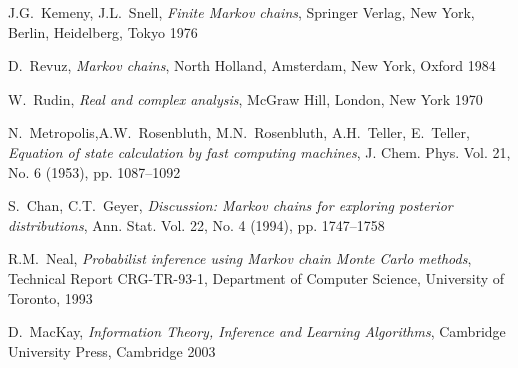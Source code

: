 \documentclass[a4paper, draft]{article}
\theoremstyle{own}
\theoremstyle{remark}
\begin{document}
\begin{thebibliography}{9}
J.G.~Kemeny, J.L.~Snell,
{\em Finite Markov chains},
Springer Verlag, New York, Berlin, Heidelberg, Tokyo 1976

D.~Revuz,
{\em Markov chains},
North Holland, Amsterdam, New York, Oxford 1984

W.~Rudin,
{\em Real and complex analysis},
McGraw Hill, London, New York 1970

N.~Metropolis,A.W.~Rosenbluth, M.N.~Rosenbluth, A.H.~Teller, E.~Teller,
{\em Equation of state calculation by fast computing machines},
J. Chem. Phys. Vol. 21, No. 6 (1953), pp. 1087--1092

S.~Chan, C.T.~Geyer,
{\em Discussion: Markov chains for exploring posterior distributions},
Ann. Stat. Vol. 22, No. 4 (1994), pp. 1747--1758


R.M.~Neal, 
{\em Probabilist inference using Markov chain Monte Carlo methods}, 
Technical Report CRG-TR-93-1, Department of Computer Science, University of Toronto, 1993


D.~MacKay,
{\em Information Theory, Inference and Learning Algorithms},
Cambridge University Press, Cambridge 2003


\end{thebibliography}
\end{document}
